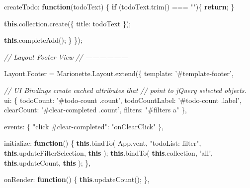 \documentclass[9pt]{book}
\newenvironment{Shaded}{}{}
\newcommand{\KeywordTok}[1]{\textcolor[rgb]{0.00,0.44,0.13}{\textbf{{#1}}}}
\newcommand{\DataTypeTok}[1]{\textcolor[rgb]{0.56,0.13,0.00}{{#1}}}
\newcommand{\StringTok}[1]{\textcolor[rgb]{0.25,0.44,0.63}{{#1}}}
\newcommand{\CommentTok}[1]{\textcolor[rgb]{0.38,0.63,0.69}{\textit{{#1}}}}
\newcommand{\OtherTok}[1]{\textcolor[rgb]{0.00,0.44,0.13}{{#1}}}
\newcommand{\FunctionTok}[1]{\textcolor[rgb]{0.02,0.16,0.49}{{#1}}}
\newcommand{\NormalTok}[1]{{#1}}
\begin{document}
\begin{Shaded}
\begin{Highlighting}[]
    \DataTypeTok{createTodo}\NormalTok{: }\KeywordTok{function}\NormalTok{(todoText) \{}
      \KeywordTok{if} \NormalTok{(}\OtherTok{todoText}\NormalTok{.}\FunctionTok{trim}\NormalTok{() === }\StringTok{""}\NormalTok{)\{ }\KeywordTok{return}\NormalTok{; \}}

      \KeywordTok{this}\NormalTok{.}\OtherTok{collection}\NormalTok{.}\FunctionTok{create}\NormalTok{(\{}
        \DataTypeTok{title}\NormalTok{: todoText}
      \NormalTok{\});}

      \KeywordTok{this}\NormalTok{.}\FunctionTok{completeAdd}\NormalTok{();}
    \NormalTok{\}}
  \NormalTok{\});}

  \CommentTok{// Layout Footer View}
  \CommentTok{// ------------------}

  \OtherTok{Layout}\NormalTok{.}\FunctionTok{Footer} \NormalTok{= }\OtherTok{Marionette}\NormalTok{.}\OtherTok{Layout}\NormalTok{.}\FunctionTok{extend}\NormalTok{(\{}
    \DataTypeTok{template}\NormalTok{: }\StringTok{'#template-footer'}\NormalTok{,}

    \CommentTok{// UI Bindings create cached attributes that}
    \CommentTok{// point to jQuery selected objects.}
    \DataTypeTok{ui}\NormalTok{: \{}
      \DataTypeTok{todoCount}\NormalTok{: }\StringTok{'#todo-count .count'}\NormalTok{,}
      \DataTypeTok{todoCountLabel}\NormalTok{: }\StringTok{'#todo-count .label'}\NormalTok{,}
      \DataTypeTok{clearCount}\NormalTok{: }\StringTok{'#clear-completed .count'}\NormalTok{,}
      \DataTypeTok{filters}\NormalTok{: }\StringTok{"#filters a"}
    \NormalTok{\},}

    \DataTypeTok{events}\NormalTok{: \{}
      \StringTok{"click #clear-completed"}\NormalTok{: }\StringTok{"onClearClick"}
    \NormalTok{\},}

    \DataTypeTok{initialize}\NormalTok{: }\KeywordTok{function}\NormalTok{() \{}
      \KeywordTok{this}\NormalTok{.}\FunctionTok{bindTo}\NormalTok{( }\OtherTok{App}\NormalTok{.}\FunctionTok{vent}\NormalTok{, }\StringTok{"todoList: filter"}\NormalTok{, }\KeywordTok{this}\NormalTok{.}\FunctionTok{updateFilterSelection}\NormalTok{, }\KeywordTok{this} \NormalTok{);}
      \KeywordTok{this}\NormalTok{.}\FunctionTok{bindTo}\NormalTok{( }\KeywordTok{this}\NormalTok{.}\FunctionTok{collection}\NormalTok{, }\StringTok{'all'}\NormalTok{, }\KeywordTok{this}\NormalTok{.}\FunctionTok{updateCount}\NormalTok{, }\KeywordTok{this} \NormalTok{);}
    \NormalTok{\},}

    \DataTypeTok{onRender}\NormalTok{: }\KeywordTok{function}\NormalTok{() \{}
      \KeywordTok{this}\NormalTok{.}\FunctionTok{updateCount}\NormalTok{();}
    \NormalTok{\},}


\end{Highlighting}
\end{Shaded}
\end{document}
